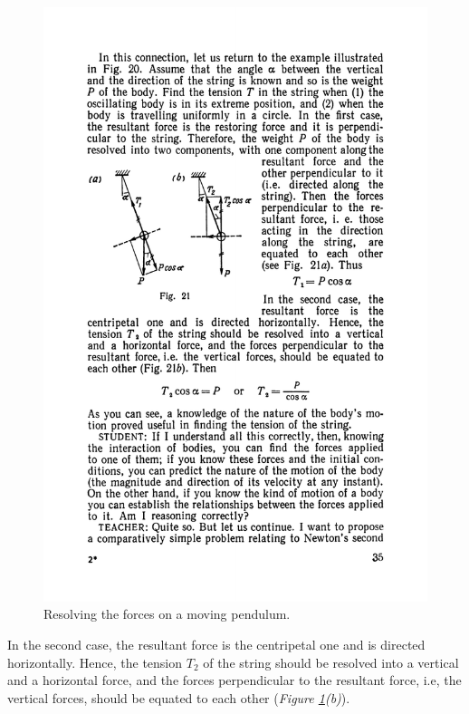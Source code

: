 \documentclass[a4paper,sfsidenotes]{tufte-book}
\begin{document}
\begin{figure}
\centering
\includegraphics[width=0.7\linewidth]{fig-021a.pdf}
\caption{Resolving the forces on a moving pendulum.}
\label{fig-21}
\end{figure}

In the second case, the resultant force is the centripetal one and is directed horizontally. Hence, the
tension $T_{2}$ of the string should be resolved into a vertical and a horizontal force, and the forces perpendicular to the resultant force, i.e, the vertical forces, should be equated to each other (\emph{Figure \ref{fig-21}(b)}). 
\end{document}
